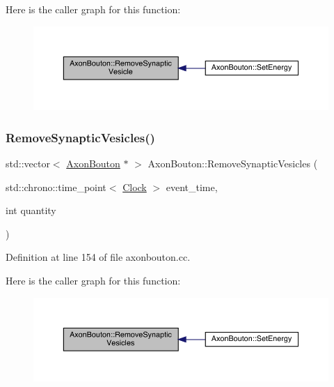 Here is the caller graph for this function\+:
\nopagebreak
\begin{figure}[H]
\begin{center}
\leavevmode
\includegraphics[width=350pt]{class_axon_bouton_a1f0b13fa7ec408c9e0cfb22cea9bbe8c_icgraph}
\end{center}
\end{figure}
\mbox{\label{class_axon_bouton_ae4119170ef72beaed3c8a0eb1d80ef14}} 
\subsubsection{\texorpdfstring{Remove\+Synaptic\+Vesicles()}{RemoveSynapticVesicles()}}
{\footnotesize\ttfamily std\+::vector$<$ \hyperlink{class_axon_bouton}{Axon\+Bouton} $\ast$ $>$ Axon\+Bouton\+::\+Remove\+Synaptic\+Vesicles (\begin{DoxyParamCaption}\item[{std\+::chrono\+::time\+\_\+point$<$ \hyperlink{universe_8h_a0ef8d951d1ca5ab3cfaf7ab4c7a6fd80}{Clock} $>$}]{event\+\_\+time,  }\item[{int}]{quantity }\end{DoxyParamCaption})}



Definition at line 154 of file axonbouton.\+cc.

Here is the caller graph for this function\+:
\nopagebreak
\begin{figure}[H]
\begin{center}
\leavevmode
\includegraphics[width=350pt]{class_axon_bouton_ae4119170ef72beaed3c8a0eb1d80ef14_icgraph}
\end{center}
\end{figure}
\mbox{\label{class_axon_bouton_a73d3721361c4e1ce6b110ffe1b4a7a88}} 
